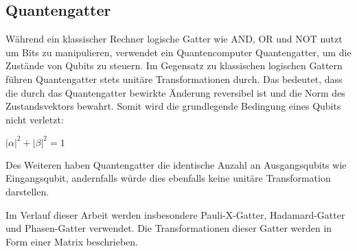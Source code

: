\subsection{Quantengatter}
Während ein klassischer Rechner logische Gatter wie AND, OR und NOT nutzt um Bits zu manipulieren, 
verwendet ein Quantencomputer Quantengatter, 
um die Zustände von Qubits zu steuern. 
Im Gegensatz zu klassischen logischen Gattern führen Quantengatter stets unitäre Transformationen durch. 
Das bedeutet, dass die durch das Quantengatter bewirkte Änderung reversibel ist und 
die Norm des Zustandsvektors bewahrt. 
Somit wird die grundlegende Bedingung eines Qubits nicht verletzt:
\begin{center}
\(\lvert\alpha\rvert^2 + \lvert\beta\rvert^2 = 1\)
\end{center}
Des Weiteren haben Quantengatter die identische Anzahl an Ausgangsqubits wie Eingangsqubit, 
andernfalls würde dies ebenfalls keine unitäre Transformation darstellen.

Im Verlauf dieser Arbeit werden insbesondere Pauli-X-Gatter, Hadamard-Gatter und Phasen-Gatter verwendet. 
Die Transformationen dieser Gatter werden in Form einer Matrix beschrieben.

\vspace{1em}


